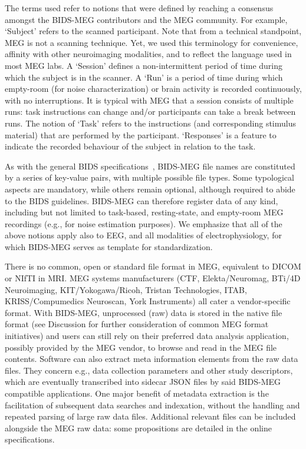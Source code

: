 The terms used refer to notions that were defined by reaching a consensus amongst the BIDS-MEG contributors and the MEG community. For example, ‘Subject’ refers to the scanned participant. Note that from a technical standpoint, MEG is not a scanning technique. Yet, we used this terminology for convenience, affinity with other neuroimaging modalities, and to reflect the language used in most MEG labs. A ‘Session’ defines a non-intermittent period of time during which the subject is in the scanner.  A ‘Run’ is a period of time during which empty-room (for noise characterization) or brain activity is recorded continuously, with no interruptions. It is typical with MEG that a session consists of multiple runs: task instructions can change and/or participants can take a break between runs. The notion of ‘Task’ refers to the instructions (and corresponding stimulus material) that are performed by the participant. ‘Responses’ is a feature to indicate the recorded behaviour of the subject in relation to the task.

As with the general BIDS specifications~\citep{gorgolewski2016brain}, BIDS-MEG file names are constituted by a series of key-value pairs, with multiple possible file types. Some  typological aspects are mandatory, while others remain optional, although required to abide to the BIDS guidelines. BIDS-MEG can therefore register data of any kind, including but not limited to task-based, resting-state, and empty-room MEG recordings (e.g., for noise estimation purposes). We emphasize that all of the above notions apply also to EEG, and all modalities of electrophysiology, for which BIDS-MEG serves as template for standardization.  

There is no common, open or standard file format in MEG, equivalent to DICOM or NIfTI in MRI. MEG systems manufacturers (CTF, Elekta/Neuromag, BTi/4D Neuroimaging, KIT/Yokogawa/Ricoh, Tristan Technologies, ITAB, KRISS/Compumedics Neuroscan, York Instruments) all cater a vendor-specific format. With BIDS-MEG, unprocessed (raw) data is stored in the native file format (see Discussion for further consideration of common MEG format initiatives) and users can still rely on their preferred data analysis application, possibly provided by the MEG vendor, to browse and read in the MEG file contents. Software can also extract meta information elements from the raw data files. They concern e.g., data collection parameters and other study descriptors, which are eventually transcribed into sidecar JSON files by said BIDS-MEG compatible applications. One major benefit of metadata extraction is the facilitation of subsequent data searches and indexation, without the handling and repeated parsing of large raw data files. Additional relevant files can be included alongside the MEG raw data: some propositions are detailed in the online specifications.

